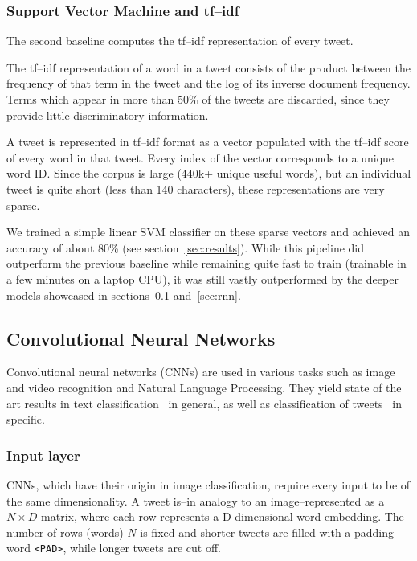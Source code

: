 \documentclass[10pt,conference,compsocconf]{IEEEtran}
\begin{document}
\subsubsection{Support Vector Machine and tf--idf}
The second baseline computes the tf--idf representation of every tweet.

The tf--idf representation of a word in a tweet consists of the product
between the frequency of that term in the tweet and the log of its inverse
document frequency.
Terms which appear in more than 50\% of the tweets are discarded,
since they provide little discriminatory information.

A tweet is represented in tf--idf format as a
vector populated with the tf--idf score of every word in that tweet. Every
index of the vector corresponds to a unique word ID. Since the corpus is
large (440k+ unique useful words), but an individual tweet is quite short (less 
than 140 characters), these representations are very sparse.

We trained a simple linear SVM classifier on these sparse vectors and achieved
an accuracy of about 80\% (see section~\ref{sec:results}). While this pipeline
did outperform the previous baseline while remaining quite fast to train
(trainable in a few minutes on a laptop CPU), it was still vastly outperformed by
the deeper models showcased in sections~\ref{sec:cnn} and~\ref{sec:rnn}.


\subsection{Convolutional Neural Networks}
\label{sec:cnn}
Convolutional neural networks (CNNs) are used in various tasks such as image and video recognition and Natural Language Processing. They yield state of the art results in text classification~\cite{kim2014convolutional} in general, as well as classification of tweets~\cite{dos2014deep,severyn2015twitter} in specific.

\subsubsection{Input layer} 
CNNs, which have their origin in image classification, require every input to be of the same dimensionality. A tweet is--in analogy to an image--represented as a $N \times D$ matrix, where each row represents a D-dimensional word embedding. The number of rows (words) $N$ is fixed and shorter tweets are filled with a padding word \texttt{<\/PAD>}, while longer tweets are cut off.
\end{document}
